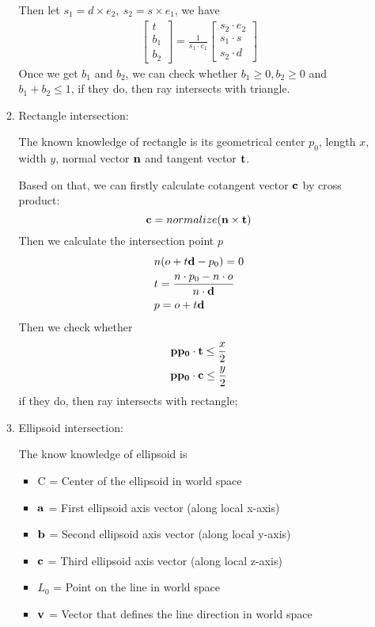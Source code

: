 \documentclass[acmtog]{acmart}
\begin{document}
\begin{enumerate}
\begin{enumerate}
	Then let $s_1=d\times e_2,\ s_2=s\times e_1$, we have 
	\begin{align*}
		\begin{bmatrix}
			t\\ b_1\\ b_2
		\end{bmatrix}=\frac{1}{s_1\cdot e_1}\begin{bmatrix}
			s_2\cdot e_2\\
			s_1\cdot s\\
			s_2\cdot d
		\end{bmatrix}
	\end{align*}
	Once we get $b_1$ and $b_2$, we can check whether $b_1\geq 0,b_2\geq 0$ and $b_1+b_2\leq 1$, if they do, then ray intersects with triangle.
	\item Rectangle intersection:
	\par The known knowledge of rectangle is its geometrical center $p_0$, length $x$, width $y$, normal vector ${\bf n}$ and tangent vector ${\bf t}$.
	\par Based on that, we can firstly calculate cotangent vector ${\bf c}$ by cross product:
	\[{\bf c} = normalize({\bf n}\times {\bf t})\]
	Then we calculate the intersection point $p$
	\begin{align*}
		&n(o+t{\bf d}-p_0)=0\\
		&t=\frac{n\cdot p_0-n\cdot o}{n\cdot {\bf d}}\\
		&p=o+t{\bf d}
	\end{align*}
	Then we check whether
	\begin{align*}
		{\bf pp_0}\cdot {\bf t}\leq \frac{x}{2}\\
		{\bf pp_0}\cdot {\bf c}\leq \frac{y}{2}
	\end{align*}
	if they do, then ray intersects with rectangle;
	\item Ellipsoid intersection:
	\par The know knowledge of ellipsoid is
	\begin{itemize}
		\item C  = Center of the ellipsoid in world space
		\item ${\bf a}$ = First ellipsoid axis vector (along local x-axis)
		\item ${\bf b}$ = Second ellipsoid axis vector (along local y-axis)
		\item ${\bf c}$ = Third ellipsoid axis vector (along local z-axis)
		
		\item $L_0$ = Point on the line in world space
		\item ${\bf v}$ = Vector that defines the line direction in world space
		

\end{itemize}
\end{enumerate}
\end{enumerate}
\end{document}
